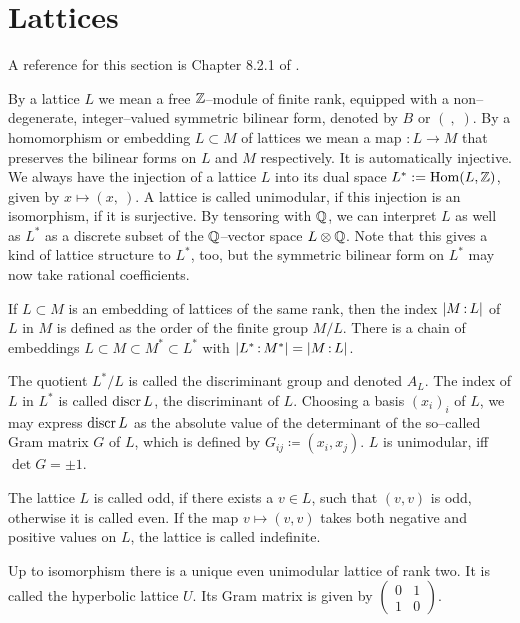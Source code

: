 
\section{Lattices}\label{latticeSubsection}A reference for this section is Chapter 8.2.1 of \cite{Dolgachev}. 
\begin{definition}
By a lattice $L$ we mean a free $\mathbb{Z}$--module of finite rank, equipped with a non--degenerate, integer--valued symmetric bilinear form, denoted by $B$ or $\left(\ ,\;\right)$. 
By a homomorphism or embedding $L\subset M$ of lattices we mean a map $:L\rightarrow M$ that preserves the bilinear forms on $L$ and $M$ respectively. It is automatically injective. We always have the injection of a lattice $L$ into its dual space $L^*:= \operatorname{Hom}(L,\mathbb{Z})$, given by $x \mapsto \left(x,\ \right)$. A lattice is called unimodular, if this injection is an isomorphism, \ie if it is surjective. By tensoring with $\mathbb{Q}$, we can interpret $L$ as well as $L^*$ as a discrete subset of the $\mathbb{Q}$--vector space $L\otimes \mathbb{Q}$. Note that this gives a kind of lattice structure to $L^*$, too, but the symmetric bilinear form on $L^*$ may now take rational coefficients.


If $L\subset M$ is an embedding of lattices of the same rank, then the index $|M\,{:}\, L|$ of $L$ in $M$ is defined as the order of the finite group $M/L$.
There is a chain of embeddings $L\subset M \subset M^* \subset L^*$ with $|L^*\,{:}\, M^*| =|M\,{:}\, L| $.

The quotient $L^*/L$ is called the discriminant group and denoted $A_L$. The index of $L$ in $L^*$ is called $\operatorname{discr} L$, the discriminant of $L$.
Choosing a basis $(x_i)_i$ of $L$, we may express $\operatorname{discr} L$ as the absolute value of the determinant of the so--called Gram matrix $G$ of $L$, which is defined by $G_{ij}\coloneqq \left(x_i,x_j\right)$. $L$ is unimodular, iff $\det G =\pm 1$.

The lattice $L$ is called odd, if there exists a $v\in L$, such that $(v,v)$ is odd, otherwise it is called even. 
If the map $v \mapsto (v,v)$ takes both negative and positive values on $L$, the lattice is called indefinite. 
\end{definition}
\begin{example}
Up to isomorphism there is a unique even unimodular lattice of rank two. It is called the hyperbolic lattice $U$. Its Gram matrix is given by 
$\left(\begin{smallmatrix} 0&1\\ 1&0 \end{smallmatrix}\right)$.
\end{example}
